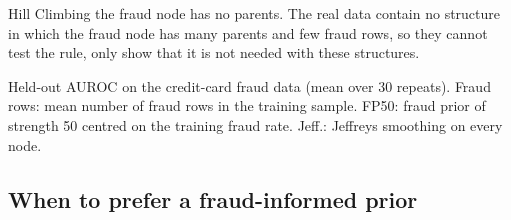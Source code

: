 \documentclass[final,5p,times,authoryear]{elsarticle}
\begin{document}
Hill Climbing the fraud node has no parents. The real data contain no structure in which the fraud node has many parents and few fraud rows, so they cannot test the rule, only show that it is not needed with these structures.

\begin{table}[H]
\centering\footnotesize
\begin{adjustbox}{max width=\linewidth}\end{adjustbox}
\caption{Held-out AUROC on the credit-card fraud data (mean over 30 repeats). Fraud rows: mean number of fraud rows in the training sample. FP50: fraud prior of strength 50 centred on the training fraud rate. Jeff.: Jeffreys smoothing on every node.}\label{tab:real}
\end{table}

\subsection{When to prefer a fraud-informed prior}\label{sec:guide}
\end{document}
